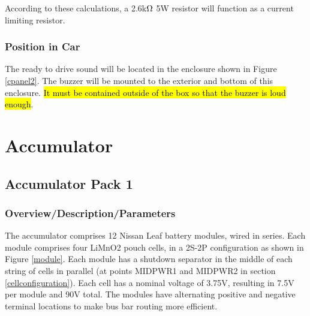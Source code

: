 \documentclass{article}
\DeclareRobustCommand{\hlr}[1]{{\sethlcolor{red}\hl{#1}}}
\begin{document}
            According to these calculations, a 2.6k$\ohm$ 5W resistor will function as a current limiting resistor.

        \subsubsection{Position in Car}

            The ready to drive sound will be located in the enclosure shown in Figure \ref{cpanel2}. The buzzer will be mounted to the exterior and bottom of this enclosure. \hlr{It must be contained outside of the box so that the buzzer is loud enough}.

\newpage

\section{Accumulator}

    \subsection{Accumulator Pack 1} \label{Battery1}

        \subsubsection{Overview/Description/Parameters} \label{batteryoverview}


            The accumulator comprises 12 Nissan Leaf battery modules, wired in series. Each module comprises four LiMnO2 pouch cells, in a 2S-2P configuration as shown in Figure \ref{module}. Each module has a shutdown separator in the middle of each string of cells in parallel (at points MIDPWR1 and MIDPWR2 in section \ref{cellconfiguration}). Each cell has a nominal voltage of 3.75V, resulting in 7.5V per module and 90V total. The modules have alternating positive and negative terminal locations to make bus bar routing more efficient.
\end{document}
